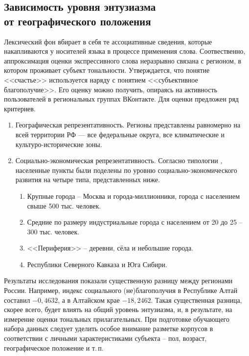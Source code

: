 \subsection[Зависимость уровня энтузиазма от географического положения]{Зависимость уровня энтузиазма\\от географического положения}
Лексический фон вбирает в себя те ассоциативные сведения, которые накапливаются у носителей языка в процессе применения слова. \cite{МатвееваТ.2013} Соотвественно, аппроксимация оценки экспрессивного слова неразрывно связана с регионом, в котором проживает субъект тональности. Утверждается, \cite{ЩекотинЕ.2020} что понятие <<счастье>> используется наряду с понятием <<субъективное благополучие>>. Его оценку можно получить, опираясь на активность пользователей в региональных группах ВКонтакте. Для оценки предложен ряд критериев.
\begin{enumerate}
	\item Географическая репрезентативность. Регионы представлены равномерно на всей территории РФ — все федеральные округа, все климатические и культуро-исторические зоны.
	\item Социально-экономическая репрезентативность. Согласно типологии \cite{Zubarevich2013}, населенные пункты были поделены по уровню социально-экономического развития на четыре типа, представленных ниже.
	\begin{enumerate}
		\item Крупные города -- Москва и города-миллионники, города с населением свыше 500 тыс. человек.
		\item  Средние по размеру индустриальные города с населением от 20 до 25 -- 300 тыс. человек.
		\item <<Периферия>> -- деревни, сёла и небольшие города.
		\item Республики Северного Кавказа и Юга Сибири.
	\end{enumerate}
\end{enumerate}
Результаты исследования показали существенную разницу между регионами России. Например, индекс социального (не)благополучия в Республике Алтай составил $-0,4632$, а в Алтайском крае $-18,2462$. Такая существенная разница, скорее всего, будет влиять на общий уровень энтузиазма, и, в результате, на измерение оценки тональных прилагательных. 
При подготовке обучающего набора данных следует уделить особое внимание разметке корпусов в соответствии с личными характеристиками субъекта -- пол, возраст, географическое положение и т.\,п.
